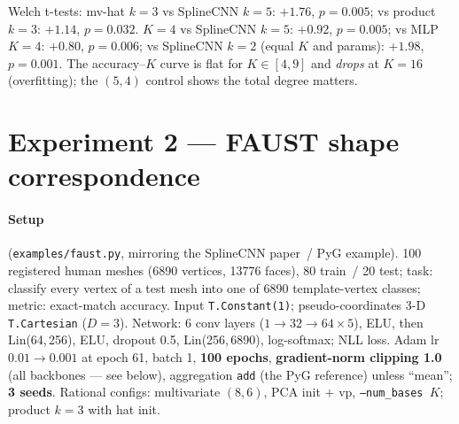 \documentclass[11pt]{article}
\newcommand{\code}[1]{\texttt{#1}}
\begin{document}
Welch t-tests: mv-hat $k{=}3$ vs SplineCNN $k{=}5$: $+1.76$, $p=0.005$; vs
product $k{=}3$: $+1.14$, $p=0.032$. $K{=}4$ vs SplineCNN $k{=}5$: $+0.92$,
$p=0.005$; vs MLP $K{=}4$: $+0.80$, $p=0.006$; vs SplineCNN $k{=}2$ (equal
$K$ and params): $+1.98$, $p=0.001$. The accuracy--$K$ curve is flat for
$K\in[4,9]$ and \emph{drops} at $K{=}16$ (overfitting); the $(5,4)$ control
shows the total degree matters.

\section{Experiment 2 --- FAUST shape correspondence}
\label{sec:faust}

\paragraph{Setup} (\code{examples/faust.py}, mirroring the SplineCNN
paper~/ PyG example). 100 registered human meshes (6890 vertices, 13776
faces), 80 train~/ 20 test; task: classify every vertex of a test mesh into
one of 6890 template-vertex classes; metric: exact-match accuracy. Input
\code{T.Constant(1)}; pseudo-coordinates 3-D \code{T.Cartesian} ($D{=}3$).
Network: 6 conv layers ($1\to32\to64\times5$), ELU, then Lin(64,\,256), ELU,
dropout 0.5, Lin(256,\,6890), log-softmax; NLL loss. Adam lr
$0.01 \to 0.001$ at epoch 61, batch 1, \textbf{100 epochs},
\textbf{gradient-norm clipping 1.0} (all backbones --- see below),
aggregation \code{add} (the PyG reference) unless ``mean''; \textbf{3
seeds}. Rational configs: multivariate $(8,6)$, PCA init $+$ vp,
\code{--num\_bases $K$}; product $k{=}3$ with hat init.
\end{document}
